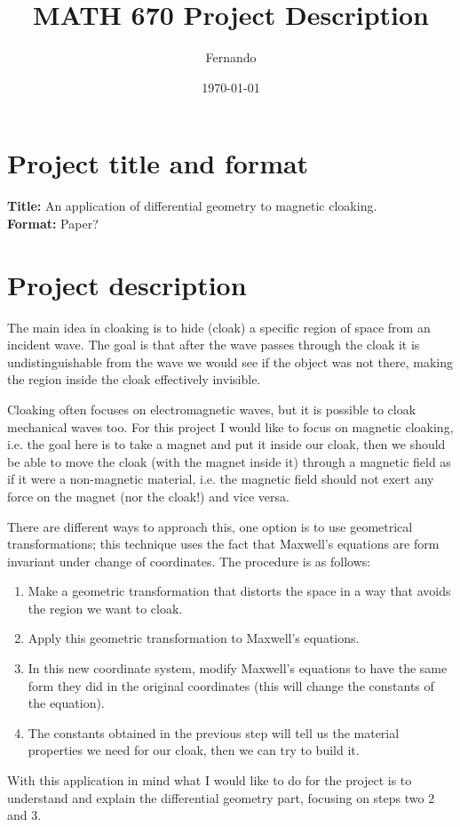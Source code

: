 \documentclass{article}
\begin{document}
\newcommand{\R}{\mathbb{R}}

\title{MATH 670 Project Description}
\author{Fernando}
\date{\today}
\maketitle

\section*{Project title and format}

\textbf{Title:} An application of differential geometry to magnetic cloaking.\\
\textbf{Format:} Paper?

\section*{Project description}

The main idea in cloaking is to hide (cloak) a specific region of space from an
incident wave. The goal is that after the wave passes through the cloak it is
undistinguishable from the wave we would see if the object was not there,
making the region inside the cloak effectively invisible.

Cloaking often focuses on electromagnetic waves, but it is possible to cloak
mechanical waves too. For this project I would like to focus on magnetic
cloaking, i.e. the goal here is to take a magnet and put it inside our cloak,
then we should be able to move the cloak (with the magnet inside it) through a
magnetic field as if it were a non-magnetic material, i.e. the magnetic field
should not exert any force on the magnet (nor the cloak!) and vice versa.

There are different ways to approach this, one option is to use geometrical
transformations; this technique uses the fact that Maxwell's equations are form
invariant under change of coordinates. The procedure is as follows:
\begin{enumerate}
\item

Make a geometric transformation that distorts the space in a way that avoids
the region we want to cloak.

\item

Apply this geometric transformation to Maxwell's equations.

\item

In this new coordinate system, modify Maxwell's equations to have the same
form they did in the original coordinates (this will change the constants of
the equation).

\item

The constants obtained in the previous step will tell us the material
properties we need for our cloak, then we can try to build it.

\end{enumerate}


With this application in mind what I would like to do for the project is to
understand and explain the differential geometry part, focusing on steps two 2
and 3.
\cite{ward96}

\printbibliography
\end{document}
